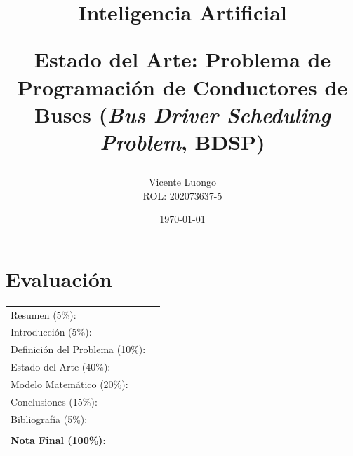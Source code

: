 \documentclass[letter, 10pt]{article}
\begin{document}
\title{Inteligencia Artificial \\ \begin{Large}Estado del Arte: Problema de Programación de Conductores de Buses (\emph{Bus Driver Scheduling Problem}, BDSP)\end{Large}}
\author{Vicente Luongo \\ ROL: 202073637-5}
\date{\today}
\maketitle


\section*{Evaluaci\'on}

\begin{tabular}{ll}
Resumen (5\%): & \underline{\hspace{2cm}} \\
Introducci\'on (5\%):  & \underline{\hspace{2cm}} \\
Definici\'on del Problema (10\%):  & \underline{\hspace{2cm}} \\
Estado del Arte (40\%):  & \underline{\hspace{2cm}} \\
Modelo Matem\'atico (20\%): &  \underline{\hspace{2cm}}\\
Conclusiones (15\%): &  \underline{\hspace{2cm}}\\
Bibliograf\'ia (5\%): & \underline{\hspace{2cm}}\\
 &  \\
\textbf{Nota Final (100\%)}:   & \underline{\hspace{2cm}}
\end{tabular}
\vspace{2cm}
\end{document}
